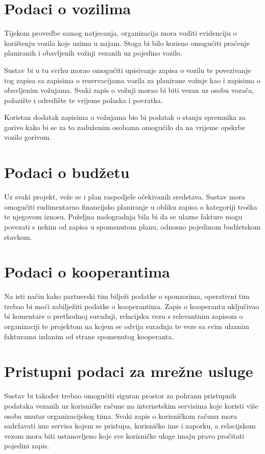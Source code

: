 \documentclass[times, utf8, diplomski]{fer}
\begin{document}
\section{Podaci o vozilima}

Tijekom provedbe samog natjecanja, organizacija mora voditi evidenciju o
korištenju vozila koje uzima u najam. Stoga bi bilo korisno omogućiti praćenje
planiranih i obavljenih vožnji vezanih uz pojedino vozilo.

Sustav bi u tu svrhu morao omogućiti upisivanje zapisa o vozilu te povezivanje
tog zapisa sa zapisima o rezervacijama vozila za planirane vožnje kao i zapisima
o obavljenim vožnjama. Svaki zapis o vožnji morao bi biti vezan uz osobu vozača,
polazište i odredište te vrijeme polaska i povratka.

Koristan dodatak zapisima o vožnjama bio bi podatak o stanju spremnika za gorivo
kako bi se za to zaduženim osobama omogućilo da na vrijeme opskrbe vozilo
gorivom.

\section{Podaci o budžetu}

Uz svaki projekt, veže se i plan raspodjele očekivanih sredstava. Sustav mora
omogućiti rudimentarno financijsko planiranje u obliku zapisa o kategoriji
troška te njegovom iznosu. Poželjna nadogradnja bila bi da se ulazne fakture
mogu povezati s nekim od zapisa u spomenutom planu, odnosno pojedinom budžetskom
stavkom.

\section{Podaci o kooperantima}

Na isti način kako partnerski tim bilježi podatke o sponzorima, operativni tim
trebao bi moći zabilježiti podatke o kooperantima. Zapis o kooperantu uključivao
bi komentare o prethodnoj suradnji, relacijsku vezu s relevantnim zapisom o
organizaciji te projektom na kojem se odvija suradnja te veze sa svim ulaznim
fakturama izdanim od strane spomenutog kooperanta.

\section{Pristupni podaci za mrežne usluge}

Sustav bi također trebao omogućiti siguran prostor za pohranu pristupnih
podataka vezanih uz korisničke račune na internetskim servisima koje koristi
više osoba unutar organizacijskog tima. Svaki zapis o korisničkom računu mora
sadržavati ime servisa kojem se pristupa, korisničko ime i zaporku, a
relacijskom vezom mora biti ustanovljeno koje sve korisničke uloge imaju pravo
pročitati pojedini zapis.
\end{document}
